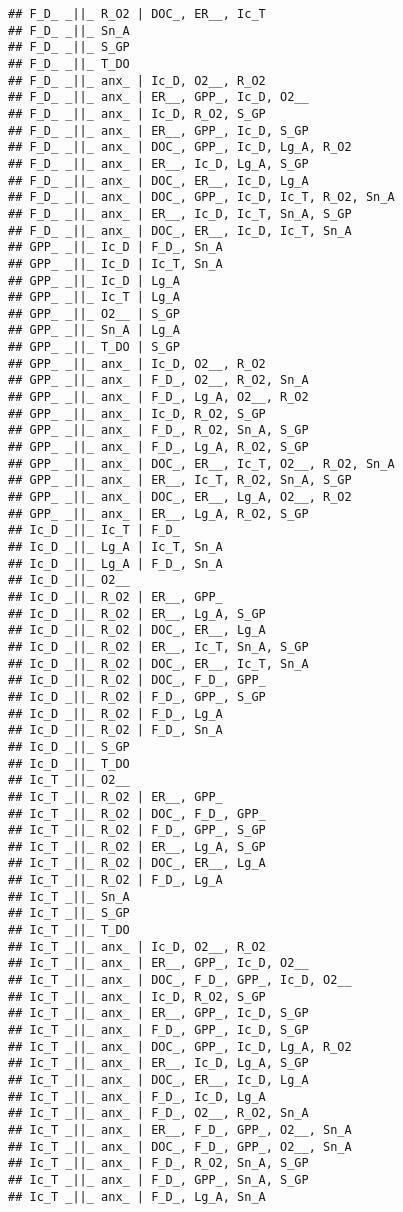 \documentclass[]{article}
\begin{document}
\begin{verbatim}
## F_D_ _||_ R_O2 | DOC_, ER__, Ic_T
## F_D_ _||_ Sn_A
## F_D_ _||_ S_GP
## F_D_ _||_ T_DO
## F_D_ _||_ anx_ | Ic_D, O2__, R_O2
## F_D_ _||_ anx_ | ER__, GPP_, Ic_D, O2__
## F_D_ _||_ anx_ | Ic_D, R_O2, S_GP
## F_D_ _||_ anx_ | ER__, GPP_, Ic_D, S_GP
## F_D_ _||_ anx_ | DOC_, GPP_, Ic_D, Lg_A, R_O2
## F_D_ _||_ anx_ | ER__, Ic_D, Lg_A, S_GP
## F_D_ _||_ anx_ | DOC_, ER__, Ic_D, Lg_A
## F_D_ _||_ anx_ | DOC_, GPP_, Ic_D, Ic_T, R_O2, Sn_A
## F_D_ _||_ anx_ | ER__, Ic_D, Ic_T, Sn_A, S_GP
## F_D_ _||_ anx_ | DOC_, ER__, Ic_D, Ic_T, Sn_A
## GPP_ _||_ Ic_D | F_D_, Sn_A
## GPP_ _||_ Ic_D | Ic_T, Sn_A
## GPP_ _||_ Ic_D | Lg_A
## GPP_ _||_ Ic_T | Lg_A
## GPP_ _||_ O2__ | S_GP
## GPP_ _||_ Sn_A | Lg_A
## GPP_ _||_ T_DO | S_GP
## GPP_ _||_ anx_ | Ic_D, O2__, R_O2
## GPP_ _||_ anx_ | F_D_, O2__, R_O2, Sn_A
## GPP_ _||_ anx_ | F_D_, Lg_A, O2__, R_O2
## GPP_ _||_ anx_ | Ic_D, R_O2, S_GP
## GPP_ _||_ anx_ | F_D_, R_O2, Sn_A, S_GP
## GPP_ _||_ anx_ | F_D_, Lg_A, R_O2, S_GP
## GPP_ _||_ anx_ | DOC_, ER__, Ic_T, O2__, R_O2, Sn_A
## GPP_ _||_ anx_ | ER__, Ic_T, R_O2, Sn_A, S_GP
## GPP_ _||_ anx_ | DOC_, ER__, Lg_A, O2__, R_O2
## GPP_ _||_ anx_ | ER__, Lg_A, R_O2, S_GP
## Ic_D _||_ Ic_T | F_D_
## Ic_D _||_ Lg_A | Ic_T, Sn_A
## Ic_D _||_ Lg_A | F_D_, Sn_A
## Ic_D _||_ O2__
## Ic_D _||_ R_O2 | ER__, GPP_
## Ic_D _||_ R_O2 | ER__, Lg_A, S_GP
## Ic_D _||_ R_O2 | DOC_, ER__, Lg_A
## Ic_D _||_ R_O2 | ER__, Ic_T, Sn_A, S_GP
## Ic_D _||_ R_O2 | DOC_, ER__, Ic_T, Sn_A
## Ic_D _||_ R_O2 | DOC_, F_D_, GPP_
## Ic_D _||_ R_O2 | F_D_, GPP_, S_GP
## Ic_D _||_ R_O2 | F_D_, Lg_A
## Ic_D _||_ R_O2 | F_D_, Sn_A
## Ic_D _||_ S_GP
## Ic_D _||_ T_DO
## Ic_T _||_ O2__
## Ic_T _||_ R_O2 | ER__, GPP_
## Ic_T _||_ R_O2 | DOC_, F_D_, GPP_
## Ic_T _||_ R_O2 | F_D_, GPP_, S_GP
## Ic_T _||_ R_O2 | ER__, Lg_A, S_GP
## Ic_T _||_ R_O2 | DOC_, ER__, Lg_A
## Ic_T _||_ R_O2 | F_D_, Lg_A
## Ic_T _||_ Sn_A
## Ic_T _||_ S_GP
## Ic_T _||_ T_DO
## Ic_T _||_ anx_ | Ic_D, O2__, R_O2
## Ic_T _||_ anx_ | ER__, GPP_, Ic_D, O2__
## Ic_T _||_ anx_ | DOC_, F_D_, GPP_, Ic_D, O2__
## Ic_T _||_ anx_ | Ic_D, R_O2, S_GP
## Ic_T _||_ anx_ | ER__, GPP_, Ic_D, S_GP
## Ic_T _||_ anx_ | F_D_, GPP_, Ic_D, S_GP
## Ic_T _||_ anx_ | DOC_, GPP_, Ic_D, Lg_A, R_O2
## Ic_T _||_ anx_ | ER__, Ic_D, Lg_A, S_GP
## Ic_T _||_ anx_ | DOC_, ER__, Ic_D, Lg_A
## Ic_T _||_ anx_ | F_D_, Ic_D, Lg_A
## Ic_T _||_ anx_ | F_D_, O2__, R_O2, Sn_A
## Ic_T _||_ anx_ | ER__, F_D_, GPP_, O2__, Sn_A
## Ic_T _||_ anx_ | DOC_, F_D_, GPP_, O2__, Sn_A
## Ic_T _||_ anx_ | F_D_, R_O2, Sn_A, S_GP
## Ic_T _||_ anx_ | F_D_, GPP_, Sn_A, S_GP
## Ic_T _||_ anx_ | F_D_, Lg_A, Sn_A

\end{verbatim}
\end{document}
